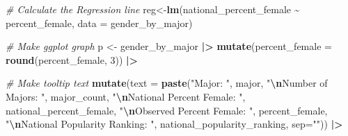 \documentclass[
  twocolumn]{article}
\newenvironment{Shaded}{\begin{snugshade}}{\end{snugshade}}
\newcommand{\AttributeTok}[1]{\textcolor[rgb]{0.13,0.29,0.53}{#1}}
\newcommand{\CommentTok}[1]{\textcolor[rgb]{0.56,0.35,0.01}{\textit{#1}}}
\newcommand{\DecValTok}[1]{\textcolor[rgb]{0.00,0.00,0.81}{#1}}
\newcommand{\FunctionTok}[1]{\textcolor[rgb]{0.13,0.29,0.53}{\textbf{#1}}}
\newcommand{\NormalTok}[1]{#1}
\newcommand{\OtherTok}[1]{\textcolor[rgb]{0.56,0.35,0.01}{#1}}
\newcommand{\SpecialCharTok}[1]{\textcolor[rgb]{0.81,0.36,0.00}{\textbf{#1}}}
\newcommand{\StringTok}[1]{\textcolor[rgb]{0.31,0.60,0.02}{#1}}
\begin{document}
\begin{Shaded}
\begin{Highlighting}[]
\CommentTok{\# Calculate the Regression line}
\NormalTok{reg}\OtherTok{\textless{}{-}}\FunctionTok{lm}\NormalTok{(national\_percent\_female }\SpecialCharTok{\textasciitilde{}}\NormalTok{ percent\_female, }\AttributeTok{data =}\NormalTok{ gender\_by\_major)}

\CommentTok{\# Make ggplot graph}
\NormalTok{p }\OtherTok{\textless{}{-}}\NormalTok{ gender\_by\_major }\SpecialCharTok{|\textgreater{}}
  \FunctionTok{mutate}\NormalTok{(}\AttributeTok{percent\_female =} \FunctionTok{round}\NormalTok{(percent\_female, }\DecValTok{3}\NormalTok{)) }\SpecialCharTok{|\textgreater{}}
  
  \CommentTok{\# Make tooltip text}
    \FunctionTok{mutate}\NormalTok{(}\AttributeTok{text =} \FunctionTok{paste}\NormalTok{(}\StringTok{"Major: "}\NormalTok{, major, }\StringTok{"}\SpecialCharTok{\textbackslash{}n}\StringTok{Number of Majors: "}\NormalTok{, major\_count, }\StringTok{"}\SpecialCharTok{\textbackslash{}n}\StringTok{National Percent Female: "}\NormalTok{, national\_percent\_female, }\StringTok{"}\SpecialCharTok{\textbackslash{}n}\StringTok{Observed Percent Female: "}\NormalTok{, percent\_female, }\StringTok{"}\SpecialCharTok{\textbackslash{}n}\StringTok{National Popularity Ranking: "}\NormalTok{, national\_popularity\_ranking, }\AttributeTok{sep=}\StringTok{""}\NormalTok{)) }\SpecialCharTok{|\textgreater{}}
  

\end{Highlighting}
\end{Shaded}
\end{document}
